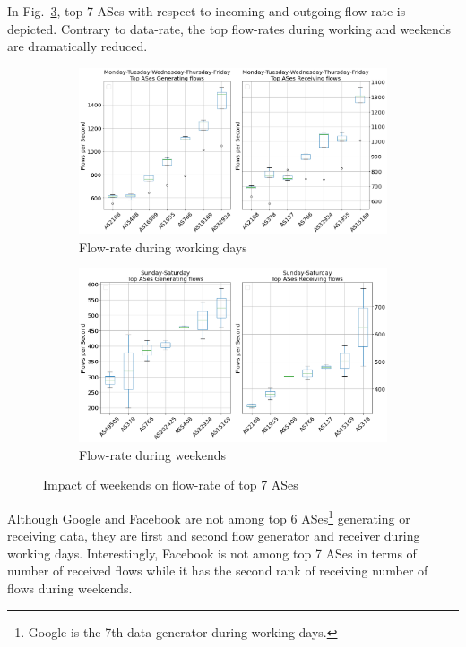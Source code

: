\documentclass[10pt, journal, letterpaper]{IEEEtran}
\begin{document}
In Fig.~\ref{fig:topAS_fps_OWD_OWE}, top 7 ASes with respect to incoming and outgoing flow-rate is depicted. Contrary to data-rate, the top flow-rates during working and weekends are dramatically reduced.
\begin{figure}[h!]
    \centering
    \begin{subfigure}{\columnwidth}
          \centering
          \includegraphics[width=\columnwidth]{img/OWD_top7ASes_fps.png}
          \caption{Flow-rate during working days}
          \label{fig:OWD_topAS_fps}
    \end{subfigure}
    \begin{subfigure}{\columnwidth}
          \centering
          \includegraphics[width=\columnwidth]{img/OWE_top7ASes_fps.png}
          \caption{Flow-rate during weekends}
          \label{fig:OWE_topAS_fps}
    \end{subfigure}
    \caption{Impact of weekends on flow-rate of top 7 ASes}
    \label{fig:topAS_fps_OWD_OWE}
\end{figure}
Although Google and Facebook are not among top 6 ASes\footnote{Google is the 7th data generator during working days.} generating or receiving data, they are first and second flow generator and receiver during working days. Interestingly, Facebook is not among top 7 ASes in terms of number of received flows while it has the second rank of receiving number of flows during weekends.
\end{document}
